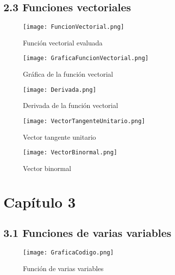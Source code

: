 \documentclass[a4 paper]{article}
\numberwithin{equation}{section}
\newcommand{\0}{\mathbf{0}}
\begin{document}

\subsection*{2.3 Funciones vectoriales}
\newpage

\begin{figure}[!ht]
  \centering
      \texttt{[image: FuncionVectorial.png]}
  \caption{Funci\'on vectorial evaluada}
\end{figure}

\begin{figure}[!ht]
  \centering
      \texttt{[image: GraficaFuncionVectorial.png]}
  \caption{Gr\'afica de la funci\'on vectorial}
\end{figure}

\begin{figure}[!ht]
  \centering
      \texttt{[image: Derivada.png]}
  \caption{Derivada de la funci\'on vectorial}
\end{figure}
\newpage
\begin{figure}[!ht]
  \centering
      \texttt{[image: VectorTangenteUnitario.png]}
  \caption{Vector tangente unitario}
\end{figure}

\newpage

\begin{figure}[!ht]
  \centering
      \texttt{[image: VectorBinormal.png]}
  \caption{Vector binormal}
\end{figure}


\section*{Cap\'itulo 3}
\subsection*{3.1 Funciones de varias variables}

\begin{figure}[!ht]
  \centering
      \texttt{[image: GraficaCodigo.png]}
  \caption{Funci\'on de varias variables}
\end{figure}
\end{document}
